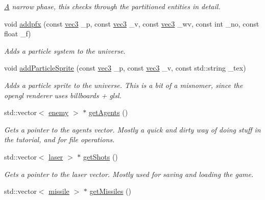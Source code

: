\begin{DoxyCompactItemize}
\begin{DoxyCompactList}\small\item\em \hyperlink{struct_a}{A} narrow phase, this checks through the partitioned entities in detail. \end{DoxyCompactList}\item 
void \hyperlink{classuniverse_a76efbef30d81b0893bbefbbb95697696}{addpfx} (const \hyperlink{structvec3}{vec3} \-\_\-p, const \hyperlink{structvec3}{vec3} \-\_\-v, const \hyperlink{structvec3}{vec3} \-\_\-wv, const int \-\_\-no, const float \-\_\-f)
\begin{DoxyCompactList}\small\item\em Adds a particle system to the universe. \end{DoxyCompactList}\item 
void \hyperlink{classuniverse_a1b868fe830fa921552b8d852ed74db1d}{add\-Particle\-Sprite} (const \hyperlink{structvec3}{vec3} \-\_\-p, const \hyperlink{structvec3}{vec3} \-\_\-v, const std\-::string \-\_\-tex)
\begin{DoxyCompactList}\small\item\em Adds a particle sprite to the universe. This is a bit of a misnomer, since the opengl renderer uses billboards + glsl. \end{DoxyCompactList}\item 
\hypertarget{classuniverse_a4e6b1f07fdd28f8308499015855ddead}{std\-::vector$<$ \hyperlink{classenemy}{enemy} $>$ $\ast$ \hyperlink{classuniverse_a4e6b1f07fdd28f8308499015855ddead}{get\-Agents} ()}\label{classuniverse_a4e6b1f07fdd28f8308499015855ddead}

\begin{DoxyCompactList}\small\item\em Gets a pointer to the agents vector. Mostly a quick and dirty way of doing stuff in the tutorial, and for file operations. \end{DoxyCompactList}\item 
\hypertarget{classuniverse_ab93032a40b560a5059aa404450d08b20}{std\-::vector$<$ \hyperlink{classlaser}{laser} $>$ $\ast$ \hyperlink{classuniverse_ab93032a40b560a5059aa404450d08b20}{get\-Shots} ()}\label{classuniverse_ab93032a40b560a5059aa404450d08b20}

\begin{DoxyCompactList}\small\item\em Gets a pointer to the laser vector. Mostly used for saving and loading the game. \end{DoxyCompactList}\item 
\hypertarget{classuniverse_ab2639f597a44279b69fec654b2790f1f}{std\-::vector$<$ \hyperlink{classmissile}{missile} $>$ $\ast$ \hyperlink{classuniverse_ab2639f597a44279b69fec654b2790f1f}{get\-Missiles} ()}\label{classuniverse_ab2639f597a44279b69fec654b2790f1f}


\end{DoxyCompactItemize}

